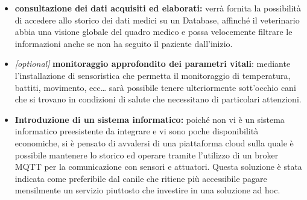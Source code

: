 \begin{itemize}
\item \textbf{consultazione dei dati acquisiti ed elaborati:} verrà fornita la possibilità di accedere allo storico dei dati medici su un Database, affinché il veterinario abbia una visione globale del quadro medico e possa velocemente filtrare le informazioni anche se non ha seguito il paziente dall'inizio. 
\item \emph{{[}optional{]}} 
\textbf{monitoraggio approfondito dei parametri vitali}: mediante l'installazione di sensoristica che permetta il monitoraggio di temperatura, battiti, movimento, ecc\ldots{} sarà possibile tenere ulteriormente sott'occhio cani che si trovano in condizioni di salute che necessitano di particolari attenzioni.

\item \textbf{Introduzione di un sistema informatico: } poiché non vi è un sistema informatico preesistente da integrare e vi sono poche disponibilità economiche, si è pensato di avvalersi di una piattaforma cloud sulla quale è possibile mantenere lo storico ed operare tramite l'utilizzo di un broker MQTT per la comunicazione  con sensori e attuatori. Questa soluzione è stata indicata come preferibile dal canile che ritiene più accessibile pagare mensilmente un servizio piuttosto che investire in una soluzione ad hoc. 

\end{itemize}





